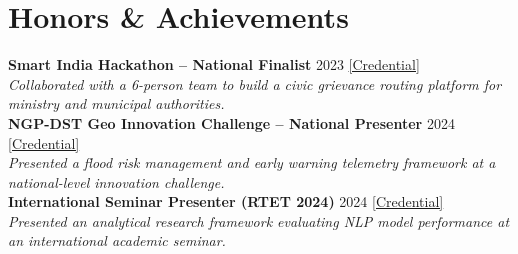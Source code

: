 \documentclass[10pt,a4paper]{article}
\begin{document}
\section*{Honors \& Achievements}
\noindent
\textbf{Smart India Hackathon -- National Finalist} \hfill 2023 \quad \href{https://drive.google.com/file/d/1LSpvR00tUAIy6ErloFasTqFllAVgryOH/view?usp=drive_link}{\small [Credential]}\\
\textit{Collaborated with a 6-person team to build a civic grievance routing platform for ministry and municipal authorities.}\\[1pt]
\textbf{NGP-DST Geo Innovation Challenge -- National Presenter} \hfill 2024 \quad \href{https://drive.google.com/file/d/1BiXBPspHi2SLBWQ2HGbcPzRJvPHHoiAD/view?usp=drive_link}{\small [Credential]}\\
\textit{Presented a flood risk management and early warning telemetry framework at a national-level innovation challenge.}\\[1pt]
\textbf{International Seminar Presenter (RTET 2024)} \hfill 2024 \quad \href{https://drive.google.com/file/d/1mB_UXSquJLat85Gv0f_MCwX6FhphC85N/view?usp=drive_link}{\small [Credential]}\\
\textit{Presented an analytical research framework evaluating NLP model performance at an international academic seminar.}
\end{document}
